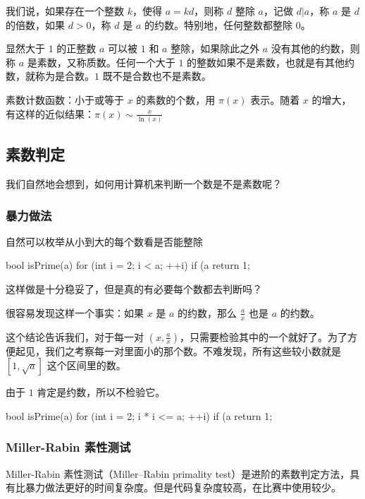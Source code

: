 
我们说，如果存在一个整数 $k$，使得 $a = kd$，则称 $d$ 整除 $a$，记做 $d | a$，称 $a$ 是 $d$ 的倍数，如果 $d > 0$，称 $d$ 是 $a$ 的约数。特别地，任何整数都整除 $0$。

显然大于 $1$ 的正整数 $a$ 可以被 $1$ 和 $a$ 整除，如果除此之外 $a$ 没有其他的约数，则称 $a$ 是素数，又称质数。任何一个大于 $1$ 的整数如果不是素数，也就是有其他约数，就称为是合数。$1$ 既不是合数也不是素数。

素数计数函数：小于或等于 $x$ 的素数的个数，用 $\pi(x)$ 表示。随着 $x$ 的增大，有这样的近似结果：$\pi(x) \sim \frac{x}{\ln(x)}$

\subsection{素数判定}

我们自然地会想到，如何用计算机来判断一个数是不是素数呢？

\subsubsection{暴力做法}

自然可以枚举从小到大的每个数看是否能整除

\begin{cppcode}
bool isPrime(a) {
  for (int i = 2; i < a; ++i)
    if (a %
  return 1;
}
\end{cppcode}

这样做是十分稳妥了，但是真的有必要每个数都去判断吗？

很容易发现这样一个事实：如果 $x$ 是 $a$ 的约数，那么 $\frac{a}{x}$ 也是 $a$ 的约数。

这个结论告诉我们，对于每一对 $(x, \frac{a}{x} )$，只需要检验其中的一个就好了。为了方便起见，我们之考察每一对里面小的那个数。不难发现，所有这些较小数就是 $[1, \sqrt{a}]$ 这个区间里的数。

由于 $1$ 肯定是约数，所以不检验它。

\begin{cppcode}
bool isPrime(a) {
  for (int i = 2; i * i <= a; ++i)
    if (a %
  return 1;
}
\end{cppcode}

\subsubsection{Miller-Rabin 素性测试}

Miller-Rabin 素性测试（Miller–Rabin primality test）是进阶的素数判定方法，具有比暴力做法更好的时间复杂度。但是代码复杂度较高，在比赛中使用较少。

